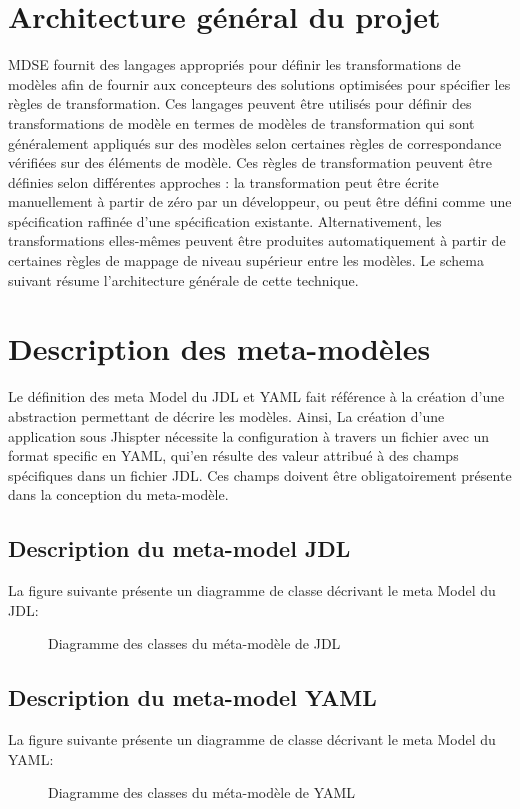 \section{Architecture général du projet}

MDSE fournit des langages appropriés pour définir les transformations de
modèles afin de fournir aux concepteurs des solutions optimisées pour
spécifier les règles de transformation. Ces langages peuvent être
utilisés pour définir des transformations de modèle en termes de modèles
de transformation qui sont généralement appliqués sur des modèles selon
certaines règles de correspondance vérifiées sur des éléments de modèle.
Ces règles de transformation peuvent être définies selon différentes
approches : la transformation peut être écrite manuellement à partir de
zéro par un développeur, ou peut être défini comme une spécification
raffinée d'une spécification existante. Alternativement, les
transformations elles-mêmes peuvent être produites automatiquement à
partir de certaines règles de mappage de niveau supérieur entre les
modèles. Le schema suivant résume l'architecture générale de cette
technique.

\section{Description des meta-modèles}

Le définition des meta Model du JDL et YAML fait référence à la création
d'une abstraction permettant de décrire les modèles. Ainsi, La création
d'une application sous Jhispter nécessite la configuration à 
travers un fichier avec un format specific en YAML, qui'en résulte
des valeur attribué à des champs spécifiques dans un fichier JDL. 
Ces champs doivent être obligatoirement présente dans la conception
du meta-modèle.

\subsection{Description du meta-model JDL}

La figure suivante présente un diagramme de classe décrivant 
le meta Model du JDL:

\begin{figure}[H]
  \begin{center}
      \caption{Diagramme des classes du méta-modèle de JDL}
  \end{center}
\end{figure}

\subsection{Description du meta-model YAML}

La figure suivante présente un diagramme de classe décrivant 
le meta Model du YAML:

\begin{figure}[H]
  \begin{center}
      \caption{Diagramme des classes du méta-modèle de YAML}
  \end{center}
\end{figure}